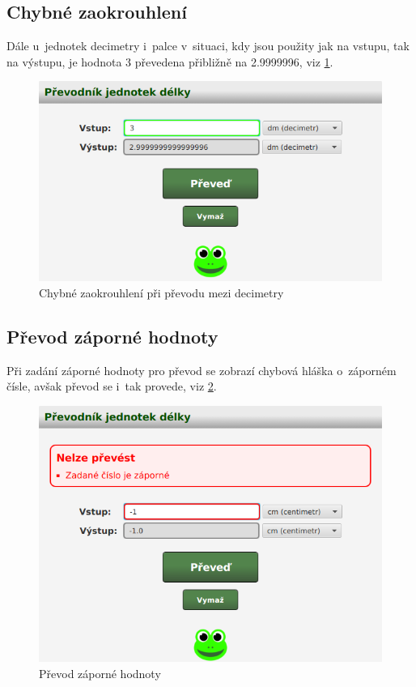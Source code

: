 		\subsection{Chybné zaokrouhlení}
		Dále u~jednotek decimetry i~palce v~situaci, kdy jsou použity jak na vstupu, tak na výstupu, je hodnota 3 převedena přibližně na 2.9999996, viz \ref{Zaokrouhleni}.
			\begin{figure}[ht!]
				\centering
				\caption{Chybné zaokrouhlení při převodu mezi decimetry}
				\label{Zaokrouhleni}
				\includegraphics[width=13.5cm]{img/Chyby/Zaokrouhleni.png}
			\end{figure}
		
		\subsection{Převod záporné hodnoty}
		Při zadání záporné hodnoty pro převod se zobrazí chybová hláška o~záporném čísle, avšak převod se i~tak provede, viz \ref{ZapornaHodnota}.
			\begin{figure}[ht!]
				\centering
				\caption{Převod záporné hodnoty}
				\label{ZapornaHodnota}
				\includegraphics[width=13.5cm]{img/Chyby/ZapornaHodnota.png}
			\end{figure}
		
